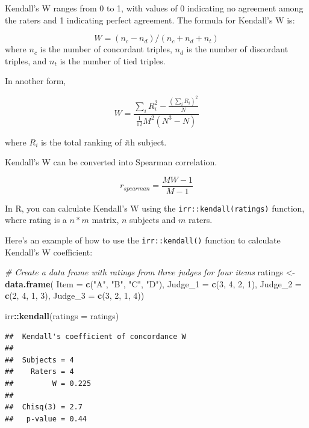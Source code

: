 \documentclass[
]{ctexart}
\newenvironment{Shaded}{\begin{snugshade}}{\end{snugshade}}
\newcommand{\AttributeTok}[1]{\textcolor[rgb]{0.13,0.29,0.53}{#1}}
\newcommand{\CommentTok}[1]{\textcolor[rgb]{0.56,0.35,0.01}{\textit{#1}}}
\newcommand{\DecValTok}[1]{\textcolor[rgb]{0.00,0.00,0.81}{#1}}
\newcommand{\FunctionTok}[1]{\textcolor[rgb]{0.13,0.29,0.53}{\textbf{#1}}}
\newcommand{\NormalTok}[1]{#1}
\newcommand{\OtherTok}[1]{\textcolor[rgb]{0.56,0.35,0.01}{#1}}
\newcommand{\SpecialCharTok}[1]{\textcolor[rgb]{0.81,0.36,0.00}{\textbf{#1}}}
\newcommand{\StringTok}[1]{\textcolor[rgb]{0.31,0.60,0.02}{#1}}
\begin{document}
Kendall's W ranges from 0 to 1, with values of 0 indicating no agreement
among the raters and 1 indicating perfect agreement. The formula for
Kendall's W is:

\[
W = (n_c - n_d) / (n_c + n_d + n_t)
\] where \(n_c\) is the number of concordant triples, \(n_d\) is the
number of discordant triples, and \(n_t\) is the number of tied triples.

In another form,

\[
W=\frac{\sum_iR_i^2-\frac{(\sum_iR_i)^2}{N}}{\frac1{12}M^2(N^3-N)}
\]

where \(R_i\) is the total ranking of \emph{i}th subject.

Kendall's W can be converted into Spearman correlation.

\[
r_{spearman}=\frac{MW-1}{M-1}
\]

In R, you can calculate Kendall's W using the
\texttt{irr::kendall(ratings)} function, where rating is a \(n*m\)
matrix, \(n\) subjects and \(m\) raters.

Here's an example of how to use the \texttt{irr::kendall()} function to
calculate Kendall's W coefficient:

\begin{Shaded}
\begin{Highlighting}[]
\CommentTok{\# Create a data frame with ratings from three judges for four items}
\NormalTok{ratings }\OtherTok{\textless{}{-}} \FunctionTok{data.frame}\NormalTok{(}
  \AttributeTok{Item =} \FunctionTok{c}\NormalTok{(}\StringTok{"A"}\NormalTok{, }\StringTok{"B"}\NormalTok{, }\StringTok{"C"}\NormalTok{, }\StringTok{"D"}\NormalTok{),}
  \AttributeTok{Judge\_1 =} \FunctionTok{c}\NormalTok{(}\DecValTok{3}\NormalTok{, }\DecValTok{4}\NormalTok{, }\DecValTok{2}\NormalTok{, }\DecValTok{1}\NormalTok{),}
  \AttributeTok{Judge\_2 =} \FunctionTok{c}\NormalTok{(}\DecValTok{2}\NormalTok{, }\DecValTok{4}\NormalTok{, }\DecValTok{1}\NormalTok{, }\DecValTok{3}\NormalTok{),}
  \AttributeTok{Judge\_3 =} \FunctionTok{c}\NormalTok{(}\DecValTok{3}\NormalTok{, }\DecValTok{2}\NormalTok{, }\DecValTok{1}\NormalTok{, }\DecValTok{4}\NormalTok{))}

\NormalTok{irr}\SpecialCharTok{::}\FunctionTok{kendall}\NormalTok{(}\AttributeTok{ratings =}\NormalTok{ ratings)}
\end{Highlighting}
\end{Shaded}

\begin{verbatim}
##  Kendall's coefficient of concordance W
## 
##  Subjects = 4 
##    Raters = 4 
##         W = 0.225 
## 
##  Chisq(3) = 2.7 
##   p-value = 0.44
\end{verbatim}
\end{document}
